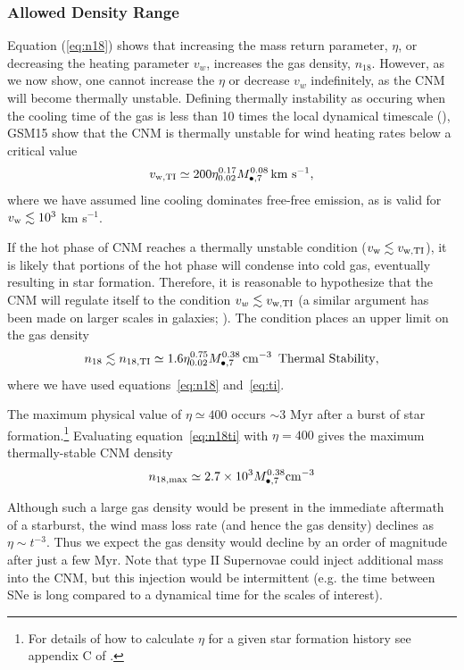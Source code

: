 \documentclass[usenatbib,fleqn]{mnras}
\newcommand{\Mbh}[1][]{M_{\bullet#1}}
\begin{document}
\subsubsection{Allowed Density Range}
\label{sec:densAllowed}

Equation (\ref{eq:n18}) shows that increasing the mass return
parameter, $\eta$, or decreasing the heating parameter $v_w$,
increases the gas density, $n_{18}$.  However, as we now show, one
cannot increase the $\eta$ or decrease $v_w$ indefinitely, as the CNM
will become thermally unstable.  Defining thermally instability as
occuring when the cooling time of the gas is less than 10 times the
local dynamical timescale (\citealt{McCourt+2012}), GSM15 show that the
CNM is thermally unstable for wind heating rates below a critical
value
\begin{equation}
v_{\rm w,TI}\simeq 200 \eta_{0.02}^{0.17} \Mbh[,7]^{0.08} \,{\rm km \,\,s^{-1}},
\label{eq:ti}
\end{equation}
where we have assumed line cooling dominates free-free emission, as is valid for $v_{\rm w} \lesssim 10^{3}$ km s$^{-1}$.

If the hot phase of CNM reaches a thermally unstable condition
($v_{\rm w} \lesssim v_{\rm w,TI}$), it is likely that portions of the
hot phase will condense into cold gas, eventually resulting in star
formation.  Therefore, it is reasonable to hypothesize that the CNM
will regulate itself to the condition $v_w \lesssim v_{\rm w,TI}$ (a
similar argument has been made on larger scales in galaxies;
\citealt{Voit+2015}).  The condition places an upper limit on the gas
density
\begin{equation}
n_{18} \lesssim n_{\rm 18,TI}\simeq 1.6 \eta_{0.02}^{0.75} \Mbh[,7]^{0.38} \, {\rm cm^{-3}}\,\,\,\text{Thermal Stability}
\label{eq:n18ti},
\end{equation}
where we have used equations~\eqref{eq:n18} and~\eqref{eq:ti}.

The maximum physical value of $\eta\simeq 400$ occurs $\sim 3$ Myr after a burst of star formation.\footnote{For details
  of how to calculate $\eta$ for a given star formation history see
  appendix C of \citet{Generozov+2015}.}  Evaluating equation~\eqref{eq:n18ti} with
$\eta=400$ gives the maximum thermally-stable CNM density
\begin{equation}
n_{\rm 18,max} \simeq 2.7\times 10^{3} \Mbh[,7]^{0.38} {\rm cm^{-3}}
\label{eq:n18max}
\end{equation}

Although such a large gas density would be present in the immediate
aftermath of a starburst, the wind mass loss rate (and hence the gas
density) declines as $\eta \sim t^{-3}$. Thus we expect the gas
density would decline by an order of magnitude after just a few Myr. Note
that type II Supernovae could inject additional mass into the CNM, but
this injection would be intermittent (e.g. the time between SNe is
long compared to a dynamical time for the scales of interest).
\end{document}
